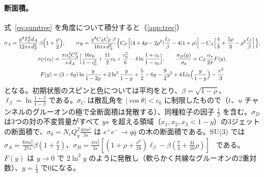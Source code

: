 \documentclass[a4paper,10pt]{ltjsarticle}
\begin{document}
\paragraph{断面積。}式~\eqref{eq:sumtree} を角度について積分すると（\ref{app:tree}）
\begin{equation}
\begin{gathered}
\sigma_A=\frac{g^4T_F^2d_A}{12\pi s\,d_F^2}\,\beta\Bigl(1+\frac\rho2\Bigr),\qquad
\sigma_B=\frac{g^4C_AC_F\,\beta}{16\pi s\,d_A^2}\Bigl\{C_F\Bigl[(4+4\rho-2\rho^2)\frac{\ell_\beta}{\beta}-4(1+\rho)\Bigr]-C_A\Bigl[\frac43+\frac{5\rho}3-\rho^2\frac{\ell_\beta}\beta\Bigr]\Bigr\},\\
\sigma_C(c_0)=\frac{\pi\alpha_s^2C_A^2}{s\,d_A}\Bigl[\frac{16c_0}{1-c_0^2}+\frac{11}2c_0+\frac{c_0^3}6-4\ln\frac{1+c_0}{1-c_0}\Bigr],\qquad
\frac{\sigma_D(y)}{\sigma_0}=C_F\frac{\alpha_s}{2\pi}F(y),\\
F(y)=(3-6y)\ln\frac{y}{1-2y}+2\ln^2\frac{y}{1-y}+\frac52-6y-\frac92y^2+4\,\mathrm{Li}_2\Bigl(\frac{y}{1-y}\Bigr)-\frac{\pi^2}3
\end{gathered}
\label{eq:sigtree}
\end{equation}
となる。初期状態のスピンと色については平均をとり、$\beta=\sqrt{1-\rho}$、$\ell_\beta=\ln\frac{1+\beta}{1-\beta}$ である。$\sigma_C$ は散乱角を $|\cos\theta|<c_0$ に制限したもので（$t$、$u$ チャンネルのグルーオンの極で全断面積は発散する）、同種粒子の因子 $\frac12$ を含む。$\sigma_D$ は3つの対の不変質量がすべて $ys$ を超える領域（$x_1,x_2,x_3<1-y$）の3ジェットの断面積で、$\sigma_0=N_cQ_q^2\frac{4\pi\alpha^2}{3s}$ は $e^+e^-\to q\bar q$ の木の断面積である。SU(3) では $\sigma_A=\frac{8\pi\alpha_s^2}{27s}\beta(1+\frac\rho2)$、$\sigma_B=\frac{\pi\alpha_s^2}{3s}[(1+\rho+\frac{\rho^2}{16})\ell_\beta-\beta(\frac74+\frac{31}{16}\rho)]$~\cite{combridge,gor} である。$F(y)$ は $y\to0$ で $2\ln^2y$ のように発散し（軟らかく共線なグルーオンの2重対数）、$y=\frac13$ で0になる。
\end{document}
